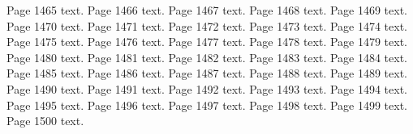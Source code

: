 \documentclass{article}
\begin{document}
Page 1465 text.\newpage
Page 1466 text.\newpage
Page 1467 text.\newpage
Page 1468 text.\newpage
Page 1469 text.\newpage
Page 1470 text.\newpage
Page 1471 text.\newpage
Page 1472 text.\newpage
Page 1473 text.\newpage
Page 1474 text.\newpage
Page 1475 text.\newpage
Page 1476 text.\newpage
Page 1477 text.\newpage
Page 1478 text.\newpage
Page 1479 text.\newpage
Page 1480 text.\newpage
Page 1481 text.\newpage
Page 1482 text.\newpage
Page 1483 text.\newpage
Page 1484 text.\newpage
Page 1485 text.\newpage
Page 1486 text.\newpage
Page 1487 text.\newpage
Page 1488 text.\newpage
Page 1489 text.\newpage
Page 1490 text.\newpage
Page 1491 text.\newpage
Page 1492 text.\newpage
Page 1493 text.\newpage
Page 1494 text.\newpage
Page 1495 text.\newpage
Page 1496 text.\newpage
Page 1497 text.\newpage
Page 1498 text.\newpage
Page 1499 text.\newpage
Page 1500 text.\newpage
\end{document}
